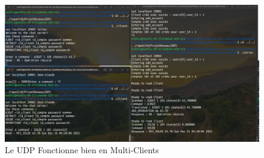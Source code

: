 \documentclass{article}
\begin{document}
\begin{figure}[h]
   \hspace*{-2cm}  
   \includegraphics[width=1.25\linewidth]{UDPmultiClients.png}
   \caption{\label{fig:UDPmultiClients}Le UDP Fonctionne bien en Multi-Clients}
\end{figure}
\end{document}
